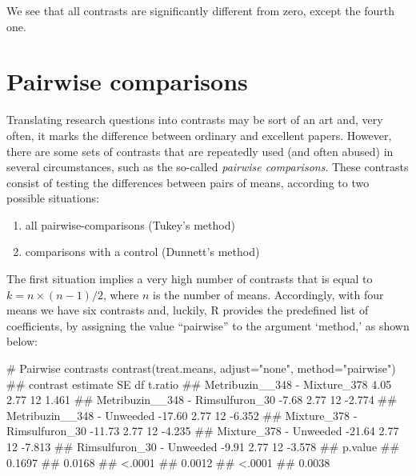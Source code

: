 \documentclass[a4paper,12pt,oneside]{book}
\providecommand{\tightlist}{%
  \setlength{\itemsep}{0pt}\setlength{\parskip}{0pt}}
\newenvironment{Shaded}{\begin{snugshade}}{\end{snugshade}}
\newcommand{\StringTok}[1]{#1}
\newcommand{\CommentTok}[1]{#1}
\newcommand{\DocumentationTok}[1]{#1}
\newcommand{\FunctionTok}[1]{#1}
\newcommand{\AttributeTok}[1]{#1}
\newcommand{\NormalTok}[1]{#1}
\begin{document}
\normalsize

We see that all contrasts are significantly different from zero, except the fourth one.

\hypertarget{pairwise-comparisons}{%
\section{Pairwise comparisons}\label{pairwise-comparisons}}

Translating research questions into contrasts may be sort of an art and, very often, it marks the difference between ordinary and excellent papers. However, there are some sets of contrasts that are repeatedly used (and often abused) in several circumstances, such as the so-called \emph{pairwise comparisons}. These contrasts consist of testing the differences between pairs of means, according to two possible situations:

\begin{enumerate}
\def\labelenumi{\arabic{enumi}.}
\tightlist
\item
  all pairwise-comparisons (Tukey's method)
\item
  comparisons with a control (Dunnett's method)
\end{enumerate}

The first situation implies a very high number of contrasts that is equal to \(k = n \times (n - 1) /2\), where \(n\) is the number of means. Accordingly, with four means we have six contrasts and, luckily, R provides the predefined list of coefficients, by assigning the value ``pairwise'' to the argument `method,' as shown below:

\footnotesize

\begin{Shaded}
\begin{Highlighting}[]
\CommentTok{\# Pairwise contrasts}
\FunctionTok{contrast}\NormalTok{(treat.means, }\AttributeTok{adjust=}\StringTok{"none"}\NormalTok{, }\AttributeTok{method=}\StringTok{"pairwise"}\NormalTok{)}
\DocumentationTok{\#\#  contrast                         estimate   SE df t.ratio}
\DocumentationTok{\#\#  Metribuzin\_\_348 {-} Mixture\_378        4.05 2.77 12  1.461 }
\DocumentationTok{\#\#  Metribuzin\_\_348 {-} Rimsulfuron\_30    {-}7.68 2.77 12 {-}2.774 }
\DocumentationTok{\#\#  Metribuzin\_\_348 {-} Unweeded         {-}17.60 2.77 12 {-}6.352 }
\DocumentationTok{\#\#  Mixture\_378 {-} Rimsulfuron\_30       {-}11.73 2.77 12 {-}4.235 }
\DocumentationTok{\#\#  Mixture\_378 {-} Unweeded             {-}21.64 2.77 12 {-}7.813 }
\DocumentationTok{\#\#  Rimsulfuron\_30 {-} Unweeded           {-}9.91 2.77 12 {-}3.578 }
\DocumentationTok{\#\#  p.value}
\DocumentationTok{\#\#  0.1697 }
\DocumentationTok{\#\#  0.0168 }
\DocumentationTok{\#\#  \textless{}.0001 }
\DocumentationTok{\#\#  0.0012 }
\DocumentationTok{\#\#  \textless{}.0001 }
\DocumentationTok{\#\#  0.0038}
\end{Highlighting}
\end{Shaded}
\end{document}
